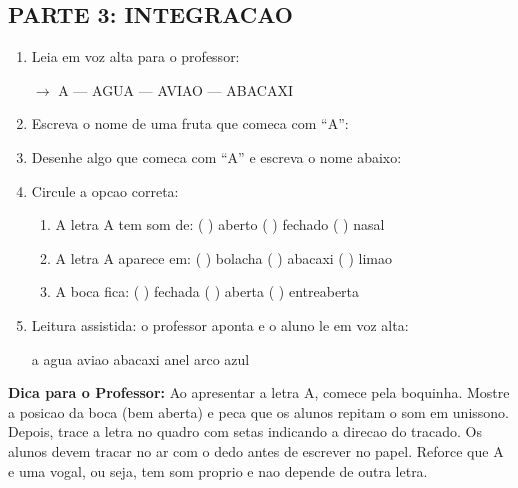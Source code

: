 \begin{exercicio}
\subsection*{PARTE 3: INTEGRACAO}

\begin{enumerate}[resume]
  \item Leia em voz alta para o professor:
  \begin{center}
  $\rightarrow$ A --- AGUA --- AVIAO --- ABACAXI
  \end{center}

  \item Escreva o nome de uma fruta que comeca com ``A'':
  \begin{center}
  \underline{\hspace{6cm}}
  \end{center}

  \item Desenhe algo que comeca com ``A'' e escreva o nome abaixo:
  \begin{center}
  \end{center}

  \item Circule a opcao correta:
  \begin{enumerate}[label=(\alph*)]
    \item A letra A tem som de: ( ) aberto ( ) fechado ( ) nasal
    \item A letra A aparece em: ( ) bolacha ( ) abacaxi ( ) limao
    \item A boca fica: ( ) fechada ( ) aberta ( ) entreaberta
  \end{enumerate}

  \item Leitura assistida: o professor aponta e o aluno le em voz alta:
  \begin{center}
  a \quad agua \quad aviao \quad abacaxi \quad anel \quad arco \quad azul
  \end{center}
\end{enumerate}
\end{exercicio}

\begin{dica}
\textbf{Dica para o Professor:} Ao apresentar a letra A, comece pela boquinha. Mostre a posicao da boca (bem aberta) e peca que os alunos repitam o som em unissono. Depois, trace a letra no quadro com setas indicando a direcao do tracado. Os alunos devem tracar no ar com o dedo antes de escrever no papel. Reforce que A e uma vogal, ou seja, tem som proprio e nao depende de outra letra.
\end{dica}

